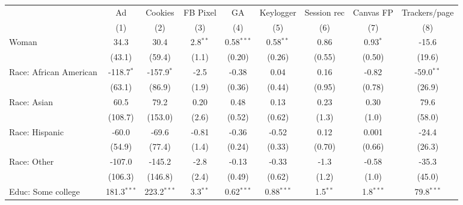 
\begingroup
\centering
\begin{adjustbox}{width = \textwidth, center}
   \begin{tabular}{lcccccccc}
      \toprule
                              & Ad            & Cookies       & FB Pixel     & GA           & Keylogger    & Session rec & Canvas FP   & Trackers/page \\   
                              & (1)           & (2)           & (3)          & (4)          & (5)          & (6)         & (7)         & (8)\\  
      \midrule 
      Woman                   & 34.3          & 30.4          & 2.8$^{**}$   & 0.58$^{***}$ & 0.58$^{**}$  & 0.86        & 0.93$^{*}$  & -15.6\\   
                              & (43.1)        & (59.4)        & (1.1)        & (0.20)       & (0.26)       & (0.55)      & (0.50)      & (19.6)\\   
      Race: African American  & -118.7$^{*}$  & -157.9$^{*}$  & -2.5         & -0.38        & 0.04         & 0.16        & -0.82       & -59.0$^{**}$\\   
                              & (63.1)        & (86.9)        & (1.9)        & (0.36)       & (0.44)       & (0.95)      & (0.78)      & (26.9)\\   
      Race: Asian             & 60.5          & 79.2          & 0.20         & 0.48         & 0.13         & 0.23        & 0.30        & 79.6\\   
                              & (108.7)       & (153.0)       & (2.6)        & (0.52)       & (0.62)       & (1.3)       & (1.0)       & (58.0)\\   
      Race: Hispanic          & -60.0         & -69.6         & -0.81        & -0.36        & -0.52        & 0.12        & 0.001       & -24.4\\   
                              & (54.9)        & (77.4)        & (1.4)        & (0.24)       & (0.33)       & (0.70)      & (0.66)      & (26.3)\\   
      Race: Other             & -107.0        & -145.2        & -2.8         & -0.13        & -0.33        & -1.3        & -0.58       & -35.3\\   
                              & (106.3)       & (146.8)       & (2.4)        & (0.49)       & (0.62)       & (1.2)       & (1.0)       & (45.0)\\   
      Educ: Some college      & 181.3$^{***}$ & 223.2$^{***}$ & 3.3$^{**}$   & 0.62$^{***}$ & 0.88$^{***}$ & 1.5$^{**}$  & 1.8$^{***}$ & 79.8$^{***}$\\   

\end{tabular}
\end{adjustbox}
